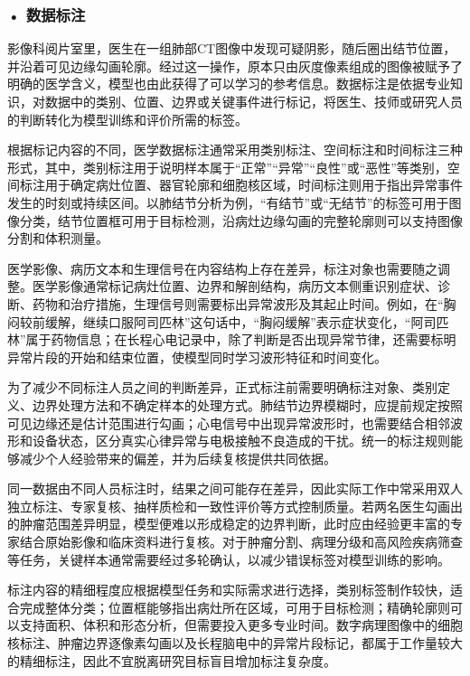 \subsubsection*{\textbf{• 数据标注}}

影像科阅片室里，医生在一组肺部CT图像中发现可疑阴影，随后圈出结节位置，并沿着可见边缘勾画轮廓。经过这一操作，原本只由灰度像素组成的图像被赋予了明确的医学含义，模型也由此获得了可以学习的参考信息。数据标注是依据专业知识，对数据中的类别、位置、边界或关键事件进行标记，将医生、技师或研究人员的判断转化为模型训练和评价所需的标签。

根据标记内容的不同，医学数据标注通常采用类别标注、空间标注和时间标注三种形式，其中，类别标注用于说明样本属于“正常”“异常”“良性”或“恶性”等类别，空间标注用于确定病灶位置、器官轮廓和细胞核区域，时间标注则用于指出异常事件发生的时刻或持续区间。以肺结节分析为例，“有结节”或“无结节”的标签可用于图像分类，结节位置框可用于目标检测，沿病灶边缘勾画的完整轮廓则可以支持图像分割和体积测量。

医学影像、病历文本和生理信号在内容结构上存在差异，标注对象也需要随之调整。医学影像通常标记病灶位置、边界和解剖结构，病历文本侧重识别症状、诊断、药物和治疗措施，生理信号则需要标出异常波形及其起止时间。例如，在“胸闷较前缓解，继续口服阿司匹林”这句话中，“胸闷缓解”表示症状变化，“阿司匹林”属于药物信息；在长程心电记录中，除了判断是否出现异常节律，还需要标明异常片段的开始和结束位置，使模型同时学习波形特征和时间变化。

为了减少不同标注人员之间的判断差异，正式标注前需要明确标注对象、类别定义、边界处理方法和不确定样本的处理方式。肺结节边界模糊时，应提前规定按照可见边缘还是估计范围进行勾画；心电信号中出现异常波形时，也需要结合相邻波形和设备状态，区分真实心律异常与电极接触不良造成的干扰。统一的标注规则能够减少个人经验带来的偏差，并为后续复核提供共同依据。

同一数据由不同人员标注时，结果之间可能存在差异，因此实际工作中常采用双人独立标注、专家复核、抽样质检和一致性评价等方式控制质量。若两名医生勾画出的肿瘤范围差异明显，模型便难以形成稳定的边界判断，此时应由经验更丰富的专家结合原始影像和临床资料进行复核。对于肿瘤分割、病理分级和高风险疾病筛查等任务，关键样本通常需要经过多轮确认，以减少错误标签对模型训练的影响。

标注内容的精细程度应根据模型任务和实际需求进行选择，类别标签制作较快，适合完成整体分类；位置框能够指出病灶所在区域，可用于目标检测；精确轮廓则可以支持面积、体积和形态分析，但需要投入更多专业时间。数字病理图像中的细胞核标注、肿瘤边界逐像素勾画以及长程脑电中的异常片段标记，都属于工作量较大的精细标注，因此不宜脱离研究目标盲目增加标注复杂度。

